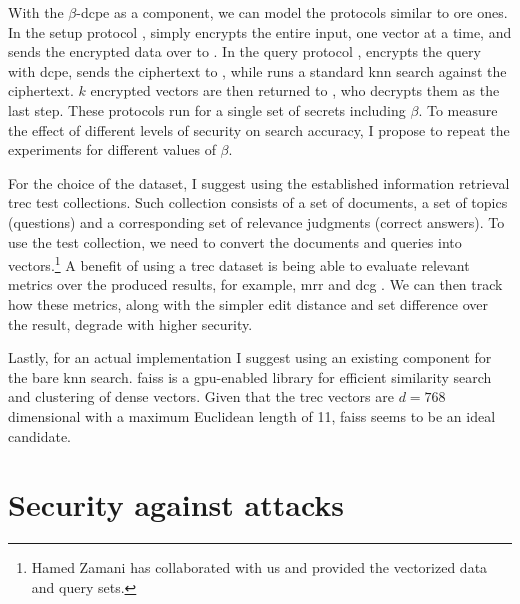 		With the $\beta$-\acrshort{dcpe} as a component, we can model the protocols similar to \acrshort{ore} ones.
		In the setup protocol \protocolSetup{}, \user{} simply encrypts the entire input, one vector at a time, and sends the encrypted data over to \server{}.
		In the query protocol \protocolQuery{}, \user{} encrypts the query with \acrshort{dcpe}, sends the ciphertext to \server{}, while \server{} runs a standard \acrshort{knn} search against the ciphertext.
		$k$ encrypted vectors are then returned to \user{}, who decrypts them as the last step.
		These protocols run for a single set of secrets including $\beta$.
		To measure the effect of different levels of security on search accuracy, I propose to repeat the experiments for different values of $\beta$.

		For the choice of the dataset, I suggest using the established information retrieval \acrshort{trec} test collections.
		Such collection consists of a set of documents, a set of topics (questions) and a corresponding set of relevance judgments (correct answers).
		To use the test collection, we need to convert the documents and queries into vectors.\footnote{
			Hamed Zamani has collaborated with us and provided the vectorized data and query sets.
		}
		A benefit of using a \acrshort{trec} dataset is being able to evaluate relevant metrics over the produced results, for example, \acrshort{mrr} \cite{mrr} and \acrshort{dcg} \cite{dcg}.
		We can then track how these metrics, along with the simpler edit distance and set difference over the result, degrade with higher security.

		Lastly, for an actual implementation I suggest using an existing component for the bare \acrshort{knn} search.
		\acrshort{faiss} \cite{faiss} is a \acrshort{gpu}-enabled library for efficient similarity search and clustering of dense vectors.
		Given that the \acrshort{trec} vectors are $d = 768$ dimensional with a maximum Euclidean length of 11, \acrshort{faiss} seems to be an ideal candidate.

	\section{Security against attacks}
